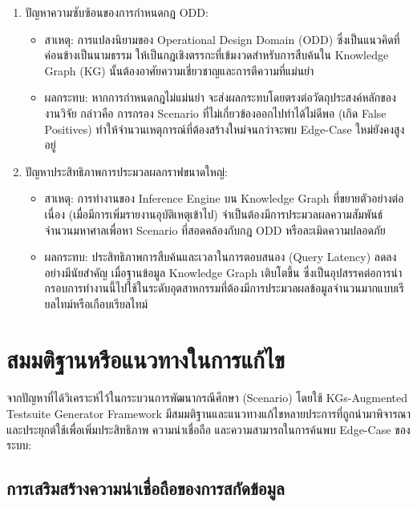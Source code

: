 \begin{enumerate}
    \item ปัญหาความซับซ้อนของการกำหนดกฎ ODD:
    \begin{itemize}
        \item สาเหตุ: การแปลงนิยามของ Operational Design Domain (ODD) ซึ่งเป็นแนวคิดที่ค่อนข้างเป็นนามธรรม ให้เป็นกฎเชิงตรรกะที่เข้มงวดสำหรับการสืบค้นใน Knowledge Graph (KG) นั้นต้องอาศัยความเชี่ยวชาญและการตีความที่แม่นยำ
        \item ผลกระทบ: หากการกำหนดกฎไม่แม่นยำ จะส่งผลกระทบโดยตรงต่อวัตถุประสงค์หลักของงานวิจัย กล่าวคือ การกรอง Scenario ที่ไม่เกี่ยวข้องออกไปทำได้ไม่ดีพอ (เกิด False Positives) ทำให้จำนวนเหตุการณ์ที่ต้องสร้างใหม่จนกว่าจะพบ Edge-Case ใหม่ยังคงสูงอยู่
    \end{itemize}
    \item ปัญหาประสิทธิภาพการประมวลผลกราฟขนาดใหญ่:
    \begin{itemize}
        \item สาเหตุ: การทำงานของ Inference Engine บน Knowledge Graph ที่ขยายตัวอย่างต่อเนื่อง (เมื่อมีการเพิ่มรายงานอุบัติเหตุเข้าไป) จำเป็นต้องมีการประมวลผลความสัมพันธ์จำนวนมหาศาลเพื่อหา Scenario ที่สอดคล้องกับกฎ ODD หรือละเมิดความปลอดภัย
        \item ผลกระทบ: ประสิทธิภาพการสืบค้นและเวลาในการตอบสนอง (Query Latency) ลดลงอย่างมีนัยสำคัญ เมื่อฐานข้อมูล Knowledge Graph เติบโตขึ้น ซึ่งเป็นอุปสรรคต่อการนำกรอบการทำงานนี้ไปใช้ในระดับอุตสาหกรรมที่ต้องมีการประมวลผลข้อมูลจำนวนมากแบบเรียลไทม์หรือเกือบเรียลไทม์
    \end{itemize}
\end{enumerate}

\section{สมมติฐานหรือแนวทางในการแก้ไข}\label{sec:hypotheses}
\paragraph{}

จากปัญหาที่ได้วิเคราะห์ไว้ในกระบวนการพัฒนากรณีศึกษา (Scenario) โดยใช้ KGs-Augmented Testsuite Generator Framework มีสมมติฐานและแนวทางแก้ไขหลายประการที่ถูกนำมาพิจารณาและประยุกต์ใช้เพื่อเพิ่มประสิทธิภาพ ความน่าเชื่อถือ และความสามารถในการค้นพบ Edge-Case ของระบบ:

\subsection{การเสริมสร้างความน่าเชื่อถือของการสกัดข้อมูล}\label{subsec:improving-data-reliability}

